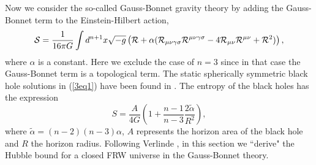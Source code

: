 \documentclass[a4paper,12pt]{article}
\begin{document}
Now we consider the so-called Gauss-Bonnet gravity theory by adding the Gauss-Bonnet
term to the Einstein-Hilbert action,
\begin{equation}
\label{3eq1}
{\cal S} =\frac{1}{16\pi G}\int d^{n+1}x\sqrt{-g} \left ({\cal R}
    +\alpha ({\cal R}_{\mu\nu\gamma\sigma}
{\cal R}^{\mu\nu\gamma\sigma} -4 {\cal R}_{\mu\nu}{\cal R}^{\mu\nu} +{\cal R}^2)\right ),
\end{equation}
where $\alpha $ is a  constant. Here we exclude the case of $n=3$ since in that case the
Gauss-Bonnet term is a topological term. The static spherically symmetric black hole solutions
in (\ref{3eq1}) have been found in \cite{Deser,Whee}. The entropy of the black holes
has the expression~\cite{Myers,Cai}
\begin{equation}
\label{3eq2}
S =\frac{A}{4G}\left ( 1 +\frac{n-1}{n-3}\frac{2\tilde \alpha }{R^2}\right),
\end{equation}
where $\tilde \alpha =(n-2)(n-3)\alpha $, $A$ represents the horizon area of the black hole
and $R$ the horizon radius. Following Verlinde \cite{Verl}, in this section
we  ``derive" the Hubble bound for a closed FRW universe in the Gauss-Bonnet theory.
\end{document}
